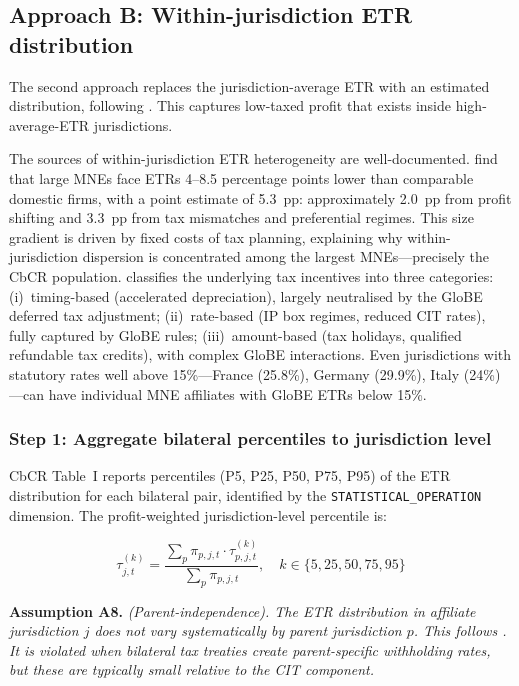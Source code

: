 \documentclass[11pt,a4paper]{article}
\newcommand{\code}[1]{\texttt{#1}}
\newcommand{\assumption}[2]{\noindent\textbf{Assumption #1.} \textit{#2}\medskip}
\begin{document}
\subsection{Approach B: Within-jurisdiction ETR distribution}\label{sec:approach_b}

The second approach replaces the jurisdiction-average ETR with an estimated distribution, following \citet{hugger2025}. This captures low-taxed profit that exists inside high-average-ETR jurisdictions.

The sources of within-jurisdiction ETR heterogeneity are well-documented. \citet{johansson2017} find that large MNEs face ETRs 4--8.5 percentage points lower than comparable domestic firms, with a point estimate of 5.3~pp: approximately 2.0~pp from profit shifting and 3.3~pp from tax mismatches and preferential regimes. This size gradient is driven by fixed costs of tax planning, explaining why within-jurisdiction dispersion is concentrated among the largest MNEs---precisely the CbCR population. \citet{liotti2022} classifies the underlying tax incentives into three categories: (i)~timing-based (accelerated depreciation), largely neutralised by the GloBE deferred tax adjustment; (ii)~rate-based (IP box regimes, reduced CIT rates), fully captured by GloBE rules; (iii)~amount-based (tax holidays, qualified refundable tax credits), with complex GloBE interactions. Even jurisdictions with statutory rates well above 15\%---France (25.8\%), Germany (29.9\%), Italy (24\%)---can have individual MNE affiliates with GloBE ETRs below 15\%.

\subsubsection{Step 1: Aggregate bilateral percentiles to jurisdiction level}

CbCR Table~I reports percentiles (P5, P25, P50, P75, P95) of the ETR distribution for each bilateral pair, identified by the \code{STATISTICAL\_OPERATION} dimension. The profit-weighted jurisdiction-level percentile is:

\begin{equation}\label{eq:jurisdiction_percentile}
\tau_{j,t}^{(k)} = \frac{\sum_p \pi_{p,j,t} \cdot \tau_{p,j,t}^{(k)}}{\sum_p \pi_{p,j,t}}, \quad k \in \{5, 25, 50, 75, 95\}
\end{equation}

\assumption{A8}{(Parent-independence). The ETR distribution in affiliate jurisdiction $j$ does not vary systematically by parent jurisdiction $p$. This follows \citet{hugger2025}. It is violated when bilateral tax treaties create parent-specific withholding rates, but these are typically small relative to the CIT component.}
\end{document}
